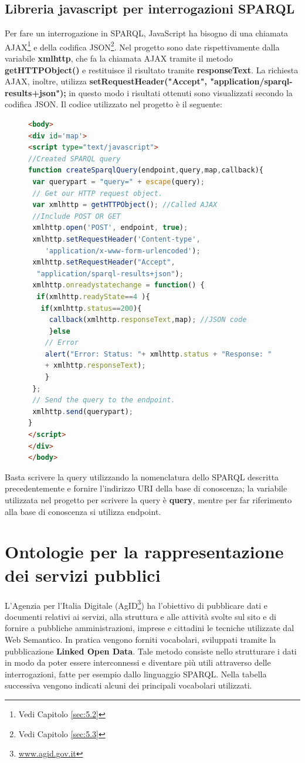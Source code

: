 \documentclass[a4paper,11pt]{article}
\begin{document}
\subsection{Libreria javascript per interrogazioni SPARQL}
\label{sec:4.3}
Per fare un interrogazione in SPARQL, JavaScript ha bisogno di una chiamata AJAX\footnote{Vedi Capitolo \ref{sec:5.2}} e della codifica JSON\footnote{Vedi Capitolo \ref{sec:5.3}}.
Nel progetto sono date rispettivamente dalla variabile \textbf{xmlhttp}, che fa la chiamata AJAX tramite il metodo \textbf{getHTTPObject()} e restituisce il risultato tramite \textbf{responseText}.
La richiesta AJAX, inoltre, utilizza \newline \textbf{setRequestHeader("Accept", "application/sparql-results+json");} \newline in questo modo i risultati ottenuti sono visualizzati secondo la codifica JSON.
Il codice utilizzato nel progetto è il seguente:
\begin{figure}[!htb]
\begin{lstlisting}[language=HTML, basicstyle=\large]
<body>		
<div id='map'>
<script type="text/javascript">
//Created SPARQL query
function createSparqlQuery(endpoint,query,map,callback){	
 var querypart = "query=" + escape(query);
 // Get our HTTP request object.
 var xmlhttp = getHTTPObject(); //Called AJAX
 //Include POST OR GET
 xmlhttp.open('POST', endpoint, true); 
 xmlhttp.setRequestHeader('Content-type',
 	'application/x-www-form-urlencoded');
 xmlhttp.setRequestHeader("Accept", 
  "application/sparql-results+json");	
 xmlhttp.onreadystatechange = function() {
  if(xmlhttp.readyState==4 ){
   if(xmlhttp.status==200){				
	 callback(xmlhttp.responseText,map); //JSON code
	 }else
	// Error
	alert("Error: Status: "+ xmlhttp.status + "Response: "
	+ xmlhttp.responseText);
	}	
 };
 // Send the query to the endpoint.
 xmlhttp.send(querypart);	
}
</script>
</div>
</body>
\end{lstlisting}
\end{figure}\newline
Basta scrivere la query utilizzando la nomenclatura dello SPARQL descritta precedentemente e fornire l'indirizzo URI della base di conoscenza; la variabile utilizzata nel progetto per scrivere la query è \textbf{query}, mentre per far riferimento alla base di conoscenza si utilizza endpoint.
\newpage
\section{Ontologie per la rappresentazione dei servizi pubblici}
\label{sec:5}
L’Agenzia per l’Italia Digitale (AgID\footnote{\url{www.agid.gov.it}}) ha l'obiettivo di pubblicare dati e documenti relativi ai servizi, alla struttura e alle attività svolte sul sito e di fornire a pubbliche amministrazioni, imprese e cittadini le tecniche utilizzate dal Web Semantico. In pratica vengono forniti vocabolari, sviluppati tramite la pubblicazione \textbf{Linked Open Data}. Tale metodo consiste nello strutturare i dati in modo da poter essere interconnessi e diventare più utili attraverso delle interrogazioni, fatte per esempio dallo linguaggio SPARQL. 
Nella tabella successiva vengono indicati alcuni dei principali vocabolari utilizzati.
\end{document}
